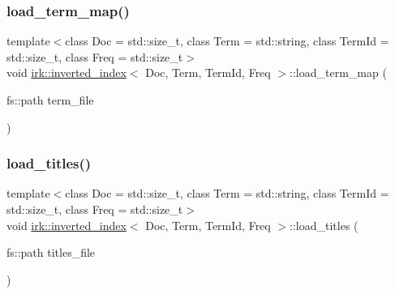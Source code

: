 \subsubsection{\texorpdfstring{load\+\_\+term\+\_\+map()}{load\_term\_map()}}
{\footnotesize\ttfamily template$<$class Doc  = std\+::size\+\_\+t, class Term  = std\+::string, class Term\+Id  = std\+::size\+\_\+t, class Freq  = std\+::size\+\_\+t$>$ \\
void \mbox{\hyperlink{classirk_1_1inverted__index}{irk\+::inverted\+\_\+index}}$<$ Doc, Term, Term\+Id, Freq $>$\+::load\+\_\+term\+\_\+map (\begin{DoxyParamCaption}\item[{fs\+::path}]{term\+\_\+file }\end{DoxyParamCaption})\hspace{0.3cm}{\ttfamily [inline]}}

\mbox{\label{classirk_1_1inverted__index_a0b389492f9ab680e28f801590472069c}} 
\subsubsection{\texorpdfstring{load\+\_\+titles()}{load\_titles()}}
{\footnotesize\ttfamily template$<$class Doc  = std\+::size\+\_\+t, class Term  = std\+::string, class Term\+Id  = std\+::size\+\_\+t, class Freq  = std\+::size\+\_\+t$>$ \\
void \mbox{\hyperlink{classirk_1_1inverted__index}{irk\+::inverted\+\_\+index}}$<$ Doc, Term, Term\+Id, Freq $>$\+::load\+\_\+titles (\begin{DoxyParamCaption}\item[{fs\+::path}]{titles\+\_\+file }\end{DoxyParamCaption})\hspace{0.3cm}{\ttfamily [inline]}}

\mbox{\label{classirk_1_1inverted__index_a95a85fe09dae6dfb47cd7bdfa8ce2a4d}} 
